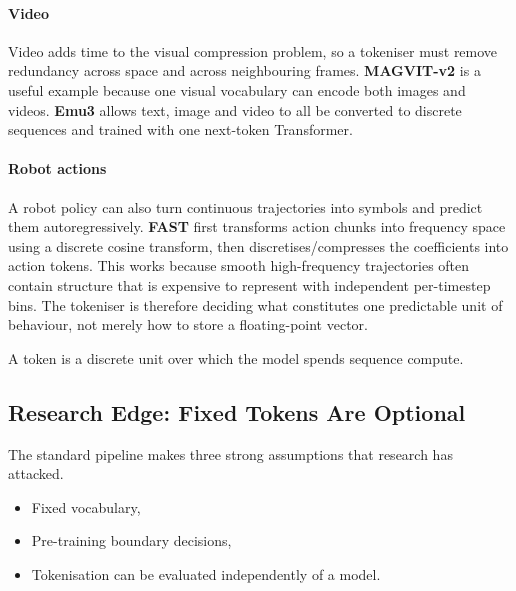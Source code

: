 \paragraph{Video}
Video adds time to the visual compression problem, so a tokeniser must remove redundancy across space and across neighbouring frames.
\textbf{MAGVIT-v2} is a useful example because one visual vocabulary can encode both images and videos.
\textbf{Emu3} allows text, image and video to all be converted to discrete sequences and trained with one next-token Transformer.

\paragraph{Robot actions}
A robot policy can also turn continuous trajectories into symbols and predict them autoregressively.
\textbf{FAST} first transforms action chunks into frequency space using a discrete cosine transform, then discretises/compresses the coefficients into action tokens.
This works because smooth high-frequency trajectories often contain structure that is expensive to represent with independent per-timestep bins.
The tokeniser is therefore deciding what constitutes one predictable unit of behaviour, not merely how to store a floating-point vector.

\begin{calloutmemoryhook}
A token is a discrete unit over which the model spends sequence compute.
\end{calloutmemoryhook}


\subsection{Research Edge: Fixed Tokens Are Optional}
The standard pipeline makes three strong assumptions that research has attacked.
\begin{itemize}
    \item Fixed vocabulary,
    \item Pre-training boundary decisions,
    \item Tokenisation can be evaluated independently of a model.
\end{itemize}

